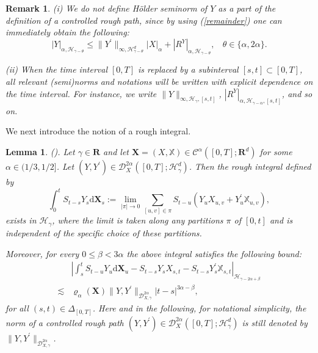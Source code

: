 \documentclass[10pt,a4paper]{article}
\newtheorem{lemma}{Lemma}[section]
\newtheorem{remark}{Remark}[section]
\numberwithin{equation}{section}
\begin{document}
\begin{remark}
(i) We do not define H\"{o}lder seminorm of $Y$ as a part of the definition of a controlled rough path,
since by using (\ref{remainder}) one can immediately obtain the following:
\begin{equation}\label{Y}
|Y|_{ \alpha , \mathcal H_{\gamma-\theta} } \leq \| Y^{\prime} \|_{\infty, \mathcal H_{\gamma-\theta}^d } |X|_{\alpha} + |R^Y|_{\alpha, \mathcal H_{\gamma-\theta} }, ~~~~ \theta \in \{\alpha,2\alpha\}.
\end{equation}

(ii) When the time interval $[0, T]$ is replaced by a subinterval $[s, t]\subset [0,T]$, all relevant (semi)norms and notations will be written with explicit dependence on the time interval. For instance, we write $\|Y\|_{\infty, \mathcal H_\gamma,[s,t]}$, $|R^Y|_{\alpha,\mathcal H_{\gamma-\alpha},[s,t]}$, and so on.
\end{remark}	






We next introduce the notion of a rough integral.




\begin{lemma}\label{RoughInt}
(\cite[Theorem 4.5]{GHN21}).
Let $\gamma \in \mathbf{R}$ and let $\mathbf{X}=(X,\mathbb{X}) \in \mathscr{C}^{\alpha}([0,T];\mathbf{R}^{d})$ for some $\alpha \in (1/3, 1/2]$.
Let $(Y,Y^{\prime}) \in \mathcal{D}_{X}^{2\alpha}([0,T];\mathcal{H}_{\gamma}^d)$.
Then the rough integral defined by
\begin{equation}\label{int}
\int_{0}^{t} S_{t-s} Y_{s} \mathrm{d}  \mathbf{X}_{s}:=\lim_{| \pi|\to 0}\sum_{[u,v]\in \pi} S_{t-u}(Y_{u} X_{u,v}+Y_{u}^{\prime}\mathbb{X}_{u,v}),
\end{equation}
exists in $\mathcal H_{\gamma}$, where the limit is taken along any partitions $\pi$ of $[0,t]$ and is independent of the specific choice of these partitions.


Moreover, for every $0\leq\beta<3\alpha$ the above integral satisfies the following bound:
\begin{align} \label{IntBound}
		& \left|\int_{s}^{t}S_{t-u}Y_{u} \mathrm{d} \mathbf X_{u}-S_{t-s}Y_{s}  X_{s,t}-S_{t-s}Y_{s}^{\prime} \mathbb X_{s,t} \right|_{\mathcal H_{\gamma-2\alpha+\beta} } \nonumber\\
		\lesssim & \varrho_{\alpha}(\mathbf{X}) \|Y, Y^{\prime}\|_{ \mathcal{D}_{X,\gamma}^{2\alpha} } |t-s|^{3\alpha-\beta},
\end{align}
for all $(s,t)\in\Delta_{[0,T]}$. Here and in the following, for notational simplicity, the norm of a controlled rough path $(Y,Y^{\prime}) \in \mathcal{D}_{X}^{2\alpha}([0,T];\mathcal{H}_{\gamma}^{d})$ is still denoted by $\|Y,Y^{\prime}\|_{\mathcal{D}_{X,\gamma}^{2\alpha} }$.
\end{lemma}
\end{document}
